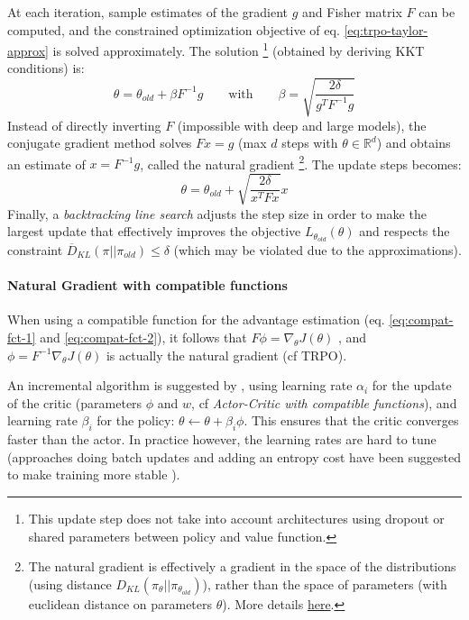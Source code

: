 At each iteration, sample estimates of the gradient $g$ and Fisher matrix $F$ can be computed, and the constrained optimization objective of eq. \ref{eq:trpo-taylor-approx} is solved approximately. The solution
\footnote{This update step does not take into account architectures using dropout or shared parameters between policy and value function.}
(obtained by deriving KKT conditions) is:
\[
    \theta = \theta_{old} + \beta F^{-1} g
    \qquad \text{with} \qquad
    \beta = \sqrt{\frac{2\delta}{g^T F^{-1} g}}
\]
Instead of directly inverting $F$ (impossible with deep and large models), the conjugate gradient method solves $Fx=g$ (max $d$ steps with $\theta \in \mathbb{R}^d$) and obtains an estimate of $x=F^{-1}g$, called the natural gradient
\footnote{The natural gradient is effectively a gradient in the space of the distributions (using distance $D_{KL}(\pi_{\theta}||\pi_{\theta_{old}})$), rather than the space of parameters (with euclidean distance on parameters $\theta$). More details \href{https://julien-vitay.net/deeprl/NaturalGradient.html}{here}.}.
The update steps becomes:
\[
    \theta = \theta_{old} + \sqrt{\frac{2\delta}{x^T F x}} x
\]
Finally, a \emph{backtracking line search} adjusts the step size in order to make the largest update that effectively improves the objective $L_{\theta_{old}}(\theta)$ and respects the constraint $\overline{D}_{KL}(\pi||\pi_{old}) \leq \delta$ (which may be violated due to the approximations).

\paragraph{Natural Gradient with compatible functions}
When using a compatible function for the advantage estimation (eq. \ref{eq:compat-fct-1} and \ref{eq:compat-fct-2}), it follows that $F \phi = \nabla_\theta J(\theta)$ \demo, and $\phi = F^{-1} \nabla_\theta J(\theta)$ is actually the natural gradient (cf TRPO).

An incremental algorithm is suggested by \cite{bhatnagar2007incremental}, using learning rate $\alpha_i$ for the update of the critic (parameters $\phi$ and $w$, cf \emph{Actor-Critic with compatible functions}), and learning rate $\beta_i$ for the policy: $\theta \leftarrow \theta + \beta_i \phi$. This ensures that the critic converges faster than the actor. In practice however, the learning rates are hard to tune (approaches doing batch updates and adding an entropy cost have been suggested to make training more stable \cite{pajarinen2019compatible}).

